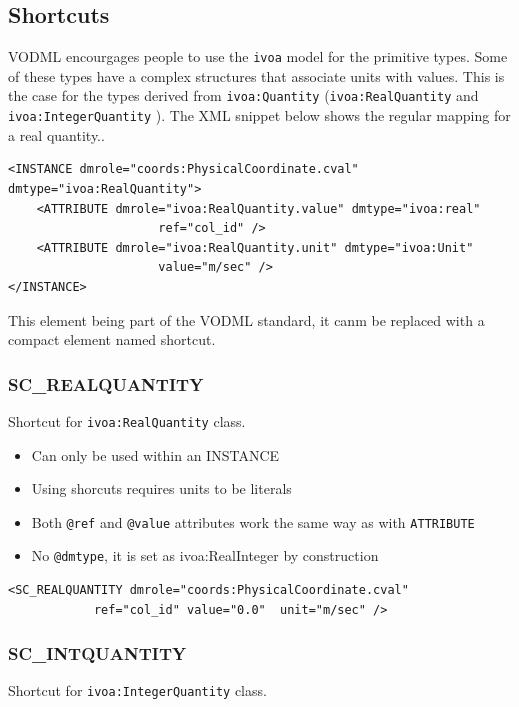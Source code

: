 \documentclass[11pt,a4paper]{ivoa}
\begin{document}
%
%

\subsection{Shortcuts}
VODML encourgages people to use the \texttt{ivoa} model for the primitive types. 
Some of these types have a complex structures that associate units with values. 
This is the case for the types derived from \texttt{ivoa:Quantity} (\texttt{ivoa:RealQuantity} and \texttt{ivoa:IntegerQuantity} ).
The XML snippet below shows the regular mapping for a real quantity..

\begin{lstlisting}[caption={ivoa:RealQuantity example},style=XML]
<INSTANCE dmrole="coords:PhysicalCoordinate.cval"
dmtype="ivoa:RealQuantity">
    <ATTRIBUTE dmrole="ivoa:RealQuantity.value" dmtype="ivoa:real"
                     ref="col_id" />
    <ATTRIBUTE dmrole="ivoa:RealQuantity.unit" dmtype="ivoa:Unit"
                     value="m/sec" />
</INSTANCE>
\end{lstlisting}

This element being part  of the VODML standard, it canm be replaced with a compact element named shortcut.


\subsubsection{SC\_REALQUANTITY}
Shortcut for \texttt{ivoa:RealQuantity} class.

\begin{itemize}
    \item Can only be used within an INSTANCE      
    \item Using shorcuts requires units to be literals   
    \item Both \texttt{@ref} and \texttt{@value} attributes work the same way as with \texttt{ATTRIBUTE}
    \item No \texttt{@dmtype},  it is set as ivoa:RealInteger by construction
 \end{itemize}


\begin{lstlisting}[caption={\texttt{ivoa:RealQuantity} example},style=XML]
<SC_REALQUANTITY dmrole="coords:PhysicalCoordinate.cval"
            ref="col_id" value="0.0"  unit="m/sec" />
\end{lstlisting}


\subsubsection{SC\_INTQUANTITY}
Shortcut for \texttt{ivoa:IntegerQuantity} class.
\end{document}
